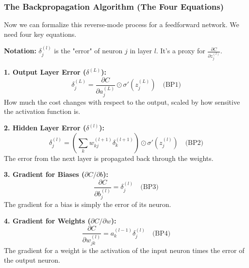 \documentclass[xcolor=svgnames, 10pt, handout]{beamer}
\begin{document}
\begin{frame}
\frametitle{The Backpropagation Algorithm (The Four Equations)}

Now we can formalize this reverse-mode process for a feedforward network. We need four key equations.

\textbf{Notation:} $\delta^{(l)}_j$ is the "error" of neuron $j$ in layer $l$. It's a proxy for $\frac{\partial C}{\partial z^{(l)}_j}$.

\vspace{0.5cm}

\textbf{1. Output Layer Error ($\delta^{(L)}$):}
\begin{equation*}
    \delta^{(L)}_j = \frac{\partial C}{\partial a^{(L)}_j} \odot \sigma'(z^{(L)}_j) \quad \text{(BP1)}
\end{equation*}
How much the cost changes with respect to the output, scaled by how sensitive the activation function is.

\textbf{2. Hidden Layer Error ($\delta^{(l)}$):}
\begin{equation*}
    \delta^{(l)}_j = \left( \sum_k w^{(l+1)}_{kj} \delta^{(l+1)}_k \right) \odot \sigma'(z^{(l)}_j) \quad \text{(BP2)}
\end{equation*}
The error from the next layer is propagated back through the weights.

\textbf{3. Gradient for Biases ($\partial C / \partial b$):}
\begin{equation*}
    \frac{\partial C}{\partial b^{(l)}_j} = \delta^{(l)}_j \quad \text{(BP3)}
\end{equation*}
The gradient for a bias is simply the error of its neuron.

\textbf{4. Gradient for Weights ($\partial C / \partial w$):}
\begin{equation*}
    \frac{\partial C}{\partial w^{(l)}_{jk}} = a^{(l-1)}_k \delta^{(l)}_j \quad \text{(BP4)}
\end{equation*}
The gradient for a weight is the activation of the input neuron times the error of the output neuron.
\end{frame}
\end{document}
